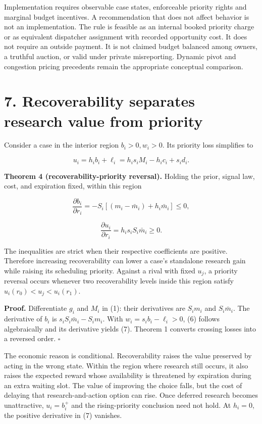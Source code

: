 \documentclass[
  11pt,
]{article}
\begin{document}
Implementation requires observable case states, enforceable priority
rights and marginal budget incentives. A recommendation that does not
affect behavior is not an implementation. The rule is feasible as an
internal booked priority charge or as equivalent dispatcher assignment
with recorded opportunity cost. It does not require an outside payment.
It is not claimed budget balanced among owners, a truthful auction, or
valid under private misreporting. Dynamic pivot and congestion pricing
precedents remain the appropriate conceptual comparison.

\section{7. Recoverability separates research value from
priority}\label{recoverability-separates-research-value-from-priority}

Consider a case in the interior region \(b_i>0,w_i>0\). Its priority
loss simplifies to

\[u_i=h_ib_i+\ell_i=h_is_iM_i-h_ic_i+s_id_i. \tag{6}\]

\textbf{Theorem 4 (recoverability-priority reversal).} Holding the
prior, signal law, cost, and expiration fixed, within this region

\[\frac{\partial b_i}{\partial r_i}=-S_i[(m_i-\bar m_i)+h_i\bar m_i]\leq0,\]

\[\frac{\partial u_i}{\partial r_i}=h_is_iS_i\bar m_i\geq0. \tag{7}\]

The inequalities are strict when their respective coefficients are
positive. Therefore increasing recoverability can lower a case's
standalone research gain while raising its scheduling priority. Against
a rival with fixed \(u_j\), a priority reversal occurs whenever two
recoverability levels inside this region satisfy
\(u_i(r_0)<u_j<u_i(r_1)\).

\textbf{Proof.} Differentiate \(g_i\) and \(M_i\) in (1): their
derivatives are \(S_im_i\) and \(S_i\bar m_i\). The derivative of
\(b_i\) is \(s_iS_i\bar m_i-S_im_i\). With \(w_i=s_ib_i-\ell_i>0\), (6)
follows algebraically and its derivative yields (7). Theorem 1 converts
crossing losses into a reversed order. \(\square\)

The economic reason is conditional. Recoverability raises the value
preserved by acting in the wrong state. Within the region where research
still occurs, it also raises the expected reward whose availability is
threatened by expiration during an extra waiting slot. The value of
improving the choice falls, but the cost of delaying that
research-and-action option can rise. Once deferred research becomes
unattractive, \(u_i=b_i^+\) and the rising-priority conclusion need not
hold. At \(h_i=0\), the positive derivative in (7) vanishes.
\end{document}
